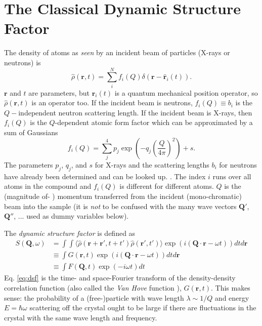 \documentclass[11pt,prb,aps,nofootinbib,superscriptaddress,floatfix]{revtex4-2}
\begin{document}
\section{The Classical Dynamic Structure Factor}
The density of atoms as \emph{seen} by an incident beam of particles (X-rays or neutrons) is \cite{dove1993introduction}
\begin{equation}
    \hat{\rho}(\bm{r},t)=\sum_i^N f_i(Q) \delta(\bm{r}-\hat{\bm{r}}_i(t)).
    \label{eq:rho}
\end{equation}
$\bm{r}$ and $t$ are parameters, but $\hat{\bm{r}}_i(t)$ is a quantum mechanical position operator, so $\hat{\rho}(\bm{r},t)$ is an operator too. If the incident beam is neutrons, $f_i(Q)\equiv b_i$ is the $Q-$independent neutron scattering length. If the incident beam is X-rays, then $f_i(Q)$ is the $Q$-dependent atomic form factor which can be approximated by a sum of Gaussians
\begin{equation}
    f_i(Q)=\sum_j^4 p_j \exp \left(-q_j \left( \frac{Q}{4\pi}\right)^2\right)+s.
    \label{eq:fQ}
\end{equation}
The parameters $p_j$, $q_j$, and $s$ for X-rays and the scattering lengths $b_i$ for neutrons have already been determined and can be looked up. \cite{hazemann2005high,brown2006intensity}. The index $i$ runs over all atoms in the compound and $f_i(Q)$ is different for different atoms. $Q$ is the (magnitude of- ) momentum transferred from the incident (mono-chromatic) beam into the sample (it is \emph{not} to be confused with the many wave vectors $\bm{Q}'$, $\bm{Q}''$, ... used as dummy variables below).

The \emph{dynamic structure factor} is defined as
\begin{equation}
    \begin{split}
    S(\bm{Q},\omega) & =\int \int \langle  \hat{\rho}(\bm{r}+\bm{r}',t+t') \hat{\rho}(\bm{r}',t') \rangle \exp(i(\bm{Q}\cdot \bm{r}-\omega t)) dt d\bm{r} \\
    & \equiv \int G(\bm{r},t) \exp (i(\bm{Q} \cdot \bm{r}-\omega t)) dt d\bm{r} \\
    & \equiv \int F(\bm{Q},t) \exp (-i \omega t) dt
    \end{split}
    \label{eq:dsf}
\end{equation}
Eq. \ref{eq:dsf} is the time- and space-Fourier transform of the density-density correlation function (also called the \emph{Van Hove} function \cite{van1954correlations}), $G(\bm{r},t)$. This makes sense: the probability of a (free-)particle with wave length $\lambda \sim 1/Q$ and energy $E=\hbar \omega$ scattering off the crystal ought to be large if there are fluctuations in the crystal with the same wave length and frequency. 
\end{document}
